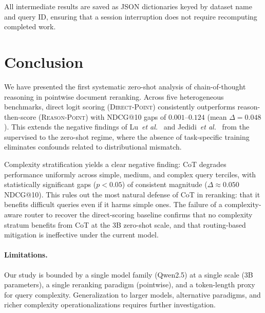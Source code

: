 \documentclass[12pt]{article}
\makeatletter
\newcommand{\ndcg}{NDCG@10}
\newcommand{\direct}{\textsc{Direct-Point}}
\newcommand{\reason}{\textsc{Reason-Point}}
\newcommand{\CoT}{CoT}
\newcommand{\etal}{\textit{et al.}}
\makeatother
\begin{document}
All intermediate results are saved as JSON dictionaries keyed by dataset name
and query ID, ensuring that a session interruption does not require recomputing
completed work.

\section{Conclusion}
\label{sec:conclusion}

We have presented the first systematic zero-shot analysis of chain-of-thought
reasoning in pointwise document reranking.  Across five heterogeneous benchmarks,
direct logit scoring (\direct{}) consistently outperforms reason-then-score
(\reason{}) with \ndcg{} gaps of $0.001$--$0.124$ (mean $\Delta=0.048$).
This extends the negative findings of Lu~\etal~\citep{lu2025rethinking} and
Jedidi~\etal~\citep{jedidi2025dont} from the supervised to the zero-shot regime,
where the absence of task-specific training eliminates confounds related to
distributional mismatch.

Complexity stratification yields a clear negative finding: \CoT{} degrades
performance uniformly across simple, medium, and complex query terciles, with
statistically significant gaps ($p<0.05$) of consistent magnitude ($\Delta
\approx 0.050$ \ndcg{}).  This rules out the most natural defense of \CoT{} in
reranking: that it benefits difficult queries even if it harms simple ones.
The failure of a complexity-aware router to recover the direct-scoring baseline
confirms that no complexity stratum benefits from \CoT{} at the 3B zero-shot
scale, and that routing-based mitigation is ineffective under the current model.

\paragraph{Limitations.}
Our study is bounded by a single model family (Qwen2.5) at a single scale (3B
parameters), a single reranking paradigm (pointwise), and a token-length proxy
for query complexity.  Generalization to larger models, alternative paradigms,
and richer complexity operationalizations requires further investigation.
\end{document}
